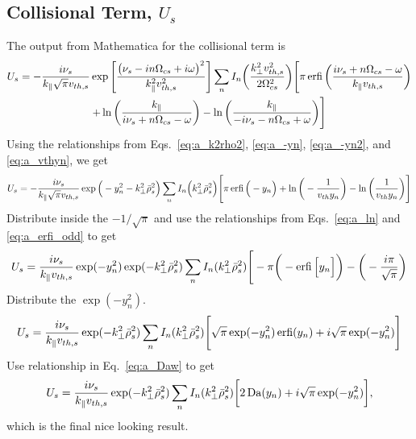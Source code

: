\subsection{Collisional Term, $U_s$}
The output from Mathematica for the collisional term is
\begin{multline}
	U_s = -\frac{i \nu_s}{k_\parallel \sqrt{\pi}v_{th,s}}
	\exp \Bigg[ \frac{\big( \nu_s - i n\Omega_{cs} + i \omega \big)^2}{k_\parallel^2 v_{th,s}^2} \Bigg]
	\sum_n I_n \bigg( \frac{k_\perp^2 v_{th,s}^2}{2\Omega_{cs}^2}\bigg)
	\Bigg[\pi \operatorname{erfi} \bigg( \frac{i\nu_s + n\Omega_{cs} - \omega}{k_\parallel v_{th,s}}  \bigg)   \\
	+ \ln \bigg( \frac{k_\parallel}{i\nu_s + n\Omega_{cs} - \omega} \bigg)
	- \ln \bigg( \frac{k_\parallel}{-i\nu_s - n\Omega_{cs} + \omega} \bigg)
	\Bigg]
\end{multline}
Using the relationships from Eqs.~\ref{eq:a_k2rho2}, \ref{eq:a_-yn}, \ref{eq:a_-yn2}, and \ref{eq:a_vthyn}, we get
\begin{equation}
	U_s = -\frac{i \nu_s}{k_\parallel \sqrt{\pi} v_{th,s}}
	\exp \Big(-y_n^2 - k_\perp^2 \bar{\rho}_s^2 \Big)
	\sum_n I_n \Big( k_\perp^2 \bar{\rho}_s^2 \Big)	
	\Bigg[ \pi \operatorname{erfi}\Big(-y_n\Big)
	+ \ln\bigg( -\frac{1}{v_{th} y_n} \bigg)
	-\ln\bigg( \frac{1}{v_{th} y_n} \bigg)
	\Bigg]
\end{equation}
Distribute inside the $-1/\sqrt{\pi}$ and use the relationships
from Eqs.~\ref{eq:a_ln} and \ref{eq:a_erfi_odd} to get
\begin{equation}
	U_s = \frac{i\nu_s}{k_\parallel v_{th,s}}
	\exp(-y_n^2)
	\exp(-k_\perp^2 \bar{\rho}_s^2)
	\sum_n I_n (k_\perp^2 \bar{\rho}_s^2) 
	\Bigg[ - \pi \bigg(-\operatorname{erfi}\Big[y_n\Big]\bigg) - 
	\bigg(- \frac{i\pi}{\sqrt{\pi}} \bigg)
\end{equation}
Distribute the $\exp(-y_n^2)$.
\begin{equation}
	U_s = \frac{i \nu_s}{k_\parallel v_{th,s}}
	\exp(-k_\perp^2 \bar{\rho}_s^2)
	\sum_n I_n (k_\perp^2 \bar{\rho}_s^2)
	\Bigg[ \sqrt{\pi} \exp(-y_n^2) \operatorname{erfi}(y_n) + i \sqrt{\pi} \exp(-y_n^2) \Bigg]
\end{equation}
Use relationship in Eq.~\ref{eq:a_Daw} to get
\begin{equation}
	U_s = \frac{i \nu_s}{k_\parallel v_{th,s}}
	\exp(-k_\perp^2 \bar{\rho}_s^2)
	\sum_n I_n (k_\perp^2 \bar{\rho}_s^2)
	\bigg[ 2\operatorname{Da}(y_n) + i \sqrt{\pi} \exp(-y_n^2)  \bigg],
\end{equation}
which is the final nice looking result.


